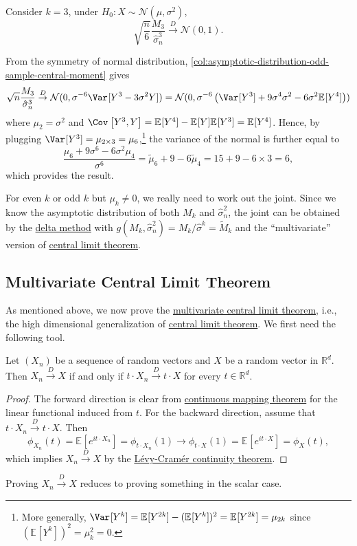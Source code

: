 \begin{eg}
	Consider \(k = 3\), under \(H_0 \colon X \sim \mathcal{N} (\mu , \sigma ^2)\),
	\[
		\sqrt{\frac{n}{6}} \frac{M_3}{\hat{\sigma} _n^3}
		\overset{D}{\to} \mathcal{N} (0, 1).
	\]
\end{eg}
\begin{explanation}
	From the symmetry of normal distribution, \autoref{col:asymptotic-distribution-odd-sample-central-moment} gives
	\[
		\sqrt{n} \frac{M_3}{\hat{\sigma} _n^3}
		\overset{D}{\to} \mathcal{N} (0, \sigma ^{-6} \Var_{}[Y^3 - 3 \sigma ^2 Y] )
		= \mathcal{N} (0, \sigma ^{-6} \left( \Var_{}[Y^3] + 9 \sigma ^4 \sigma ^2 - 6 \sigma ^2 \mathbb{E}_{}[Y^4] \right) )
	\]
	where  \(\mu _2 = \sigma ^2\) and \(\Cov_{}\left[Y^3 , Y\right] = \mathbb{E}_{}[Y^4] - \mathbb{E}_{}[Y] \mathbb{E}_{}[Y^3] = \mathbb{E}_{}[Y^4] \). Hence, by plugging \(\Var_{}[Y^3] = \mu _{2 \times 3} = \mu _6\),\footnote{More generally, \(\Var_{}[Y^k] = \mathbb{E}_{}[Y^{2k} ] - (\mathbb{E}_{}[Y^k] )^2 = \mathbb{E}_{}[Y^{2k} ] = \mu _{2k}\) since \((\mathbb{E}_{}[Y^k] )^2 = \mu _k^2 = 0\).} the variance of the normal is further equal to
	\[
		\frac{\mu _6 + 9 \sigma ^6 - 6 \sigma ^2 \mu _4}{\sigma ^6}
		= \widetilde{\mu} _6 + 9 - 6 \widetilde{\mu} _4
		= 15 + 9 - 6 \times 3
		= 6,
	\]
	which provides the result.
\end{explanation}

For even \(k\) or odd \(k\) but \(\mu _k \neq 0\), we really need to work out the joint. Since we know the asymptotic distribution of both \(M_k\) and \(\hat{\sigma} _n^2\), the joint can be obtained by the \hyperref[thm:delta-method]{delta method} with \(g(M_k , \hat{\sigma} _n^2) = M_k / \hat{\sigma} ^k = \widetilde{M} _k\) and the ``multivariate'' version of \hyperref[thm:CLT]{central limit theorem}.

\subsection{Multivariate Central Limit Theorem}
As mentioned above, we now prove the \hyperref[thm:multivariate-CLT]{multivariate central limit theorem}, i.e., the high dimensional generalization of \hyperref[thm:CLT]{central limit theorem}. We first need the following tool.

\begin{theorem}\label{thm:Cramer-Wold-device}
	Let \((X_n)\) be a sequence of random vectors and \(X\) be a random vector in \(\mathbb{R} ^d\). Then \(X_n \overset{D}{\to} X\) if and only if \(t \cdot X_n \overset{D}{\to} t \cdot X\) for every \(t \in \mathbb{R} ^d\).
\end{theorem}
\begin{proof}
	The forward direction is clear from \hyperref[thm:continuous-mapping]{continuous mapping theorem} for the linear functional induced from \(t\). For the backward direction, assume that \(t \cdot X_n \overset{D}{\to} t \cdot X\). Then
	\[
		\phi _{X_n}(t)
		= \mathbb{E}_{}[e^{i t \cdot X_n}]
		= \phi _{t \cdot X_n}(1)
		\to \phi _{t \cdot X}(1)
		= \mathbb{E}_{}[e^{i t \cdot X}]
		= \phi _X(t),
	\]
	which implies \(X_n \overset{D}{\to} X\) by the \hyperref[thm:Levy-Cramer-continuity]{Lévy-Cramér continuity theorem}.
\end{proof}

\begin{remark}
	Proving \(X_n \overset{D}{\to} X\) reduces to proving something in the scalar case.
\end{remark}